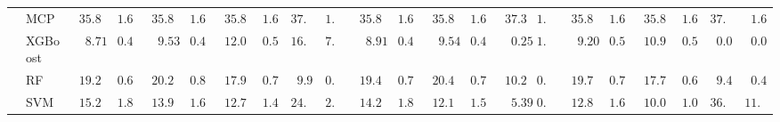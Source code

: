 \begin{tabular}{p{0.2cm}p{1cm}|p{0.6cm}p{0.6cm}|p{0.6cm}p{0.6cm}p{0.6cm}p{0.6cm}p{0.6cm}p{0.6cm}|p{0.6cm}p{0.6cm}p{0.6cm}p{0.6cm}p{0.6cm}p{0.6cm}|p{0.6cm}p{0.6cm}p{0.6cm}p{0.6cm}p{0.6cm}p{0.6cm}}
 & MCP  & $\phantom{0}35.86$ & $\phantom{0}1.63$ & $\phantom{0}35.86$ & $\phantom{0}1.62$ & $\phantom{0}35.89$ & $\phantom{0}1.62$ & $37.05$ & $1.63$ & $\phantom{0}35.86$ & $\phantom{0}1.63$ & $\phantom{0}35.88$ & $\phantom{0}1.64$ & $\phantom{0}37.33$ & $1.69$ & $\phantom{0}35.85$ & $\phantom{0}1.62$ & $\phantom{0}35.88$ & $\phantom{0}1.63$ & $37.04$ & $\phantom{0}1.67$ \\
 & XGBoost  & $\phantom{00}8.71$ & $\phantom{0}0.46$ & $\phantom{00}9.53$ & $\phantom{0}0.44$ & $\phantom{0}12.01$ & $\phantom{0}0.59$ & $16.90$ & $7.19$ & $\phantom{00}8.91$ & $\phantom{0}0.46$ & $\phantom{00}9.54$ & $\phantom{0}0.48$ & $\phantom{00}0.25$ & $1.75$ & $\phantom{00}9.20$ & $\phantom{0}0.51$ & $\phantom{0}10.92$ & $\phantom{0}0.55$ & $\phantom{0}0.00$ & $\phantom{0}0.00$ \\
 & RF  & $\phantom{0}19.27$ & $\phantom{0}0.69$ & $\phantom{0}20.27$ & $\phantom{0}0.82$ & $\phantom{0}17.96$ & $\phantom{0}0.70$ & $\phantom{0}9.93$ & $0.40$ & $\phantom{0}19.45$ & $\phantom{0}0.72$ & $\phantom{0}20.47$ & $\phantom{0}0.77$ & $\phantom{0}10.24$ & $0.51$ & $\phantom{0}19.77$ & $\phantom{0}0.78$ & $\phantom{0}17.79$ & $\phantom{0}0.60$ & $\phantom{0}9.49$ & $\phantom{0}0.42$ \\
 & SVM  & $\phantom{0}15.24$ & $\phantom{0}1.86$ & $\phantom{0}13.92$ & $\phantom{0}1.68$ & $\phantom{0}12.77$ & $\phantom{0}1.48$ & $24.00$ & $2.51$ & $\phantom{0}14.25$ & $\phantom{0}1.81$ & $\phantom{0}12.18$ & $\phantom{0}1.56$ & $\phantom{00}5.39$ & $0.47$ & $\phantom{0}12.89$ & $\phantom{0}1.63$ & $\phantom{0}10.07$ & $\phantom{0}1.00$ & $36.55$ & $11.75$ \\
\hline 
\end{tabular}

